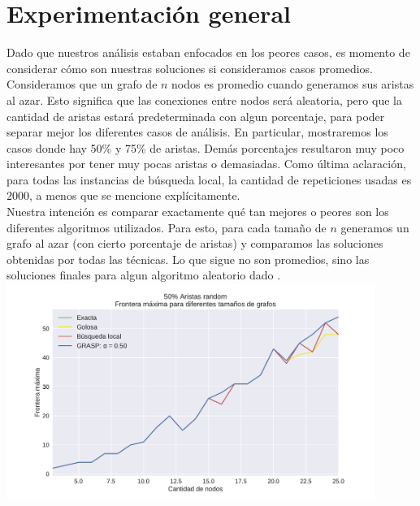 \section{Experimentación general}

Dado que nuestros análisis estaban enfocados en los peores casos, es momento de considerar cómo son nuestras soluciones si consideramos casos promedios.  \\

Consideramos que un grafo de $n$ nodos es promedio cuando generamos sus aristas al azar. Esto significa que las conexiones entre nodos será aleatoria, pero que la cantidad de aristas estará predeterminada con algun porcentaje, para poder separar mejor los diferentes casos de análisis. En particular, mostraremos los casos donde hay 50\% y 75\% de aristas. Demás porcentajes resultaron muy poco interesantes por tener muy pocas aristas o demasiadas. Como última aclaración, para todas las instancias de búsqueda local, la cantidad de repeticiones usadas es $2000$, a menos que se mencione explícitamente. \\

Nuestra intención es comparar exactamente qué tan mejores o peores son los diferentes algoritmos utilizados. Para esto, para cada tamaño de $n$ generamos un grafo al azar (con cierto porcentaje de aristas) y comparamos las soluciones obtenidas por todas las técnicas. Lo que sigue no son promedios, sino las soluciones finales para algun algoritmo aleatorio dado . \\

{\centering
    \includegraphics[width=0.9\textwidth]{informe/imgs/exp_random50_frontera_todos_v2.pdf}
}
$ $ \newline

